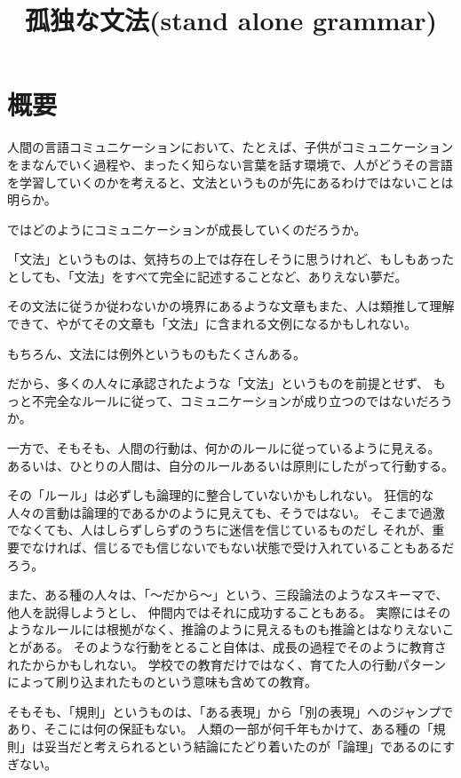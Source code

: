 \documentclass[10pt, oneside]{jarticle}   	%
\title{孤独な文法(stand alone grammar)}
\author{\myname}
\begin{document}
\maketitle

\section{概要}
人間の言語コミュニケーションにおいて、たとえば、子供がコミュニケーションをまなんでいく過程や、まったく知らない言葉を話す環境で、人がどうその言語を学習していくのかを考えると、文法というものが先にあるわけではないことは明らか。

ではどのようにコミュニケーションが成長していくのだろうか。

「文法」というものは、気持ちの上では存在しそうに思うけれど、もしもあったとしても、「文法」をすべて完全に記述することなど、ありえない夢だ。

その文法に従うか従わないかの境界にあるような文章もまた、人は類推して理解できて、やがてその文章も「文法」に含まれる文例になるかもしれない。

もちろん、文法には例外というものもたくさんある。

だから、多くの人々に承認されたような「文法」というものを前提とせず、
もっと不完全なルールに従って、コミュニケーションが成り立つのではないだろうか。

一方で、そもそも、人間の行動は、何かのルールに従っているように見える。
あるいは、ひとりの人間は、自分のルールあるいは原則にしたがって行動する。

その「ルール」は必ずしも論理的に整合していないかもしれない。
狂信的な人々の言動は論理的であるかのように見えても、そうではない。
そこまで過激でなくても、人はしらずしらずのうちに迷信を信じているものだし
それが、重要でなければ、信じるでも信じないでもない状態で受け入れていることもあるだろう。

また、ある種の人々は、「〜だから〜」という、三段論法のようなスキーマで、他人を説得しようとし、
仲間内ではそれに成功することもある。
実際にはそのようなルールには根拠がなく、推論のように見えるものも推論とはなりえないことがある。
そのような行動をとること自体は、成長の過程でそのように教育されたからかもしれない。
学校での教育だけではなく、育てた人の行動パターンによって刷り込まれたものという意味も含めての教育。

そもそも、「規則」というものは、「ある表現」から「別の表現」へのジャンプであり、そこには何の保証もない。
人類の一部が何千年もかけて、ある種の「規則」は妥当だと考えられるという結論にたどり着いたのが「論理」であるのにすぎない。
\end{document}
